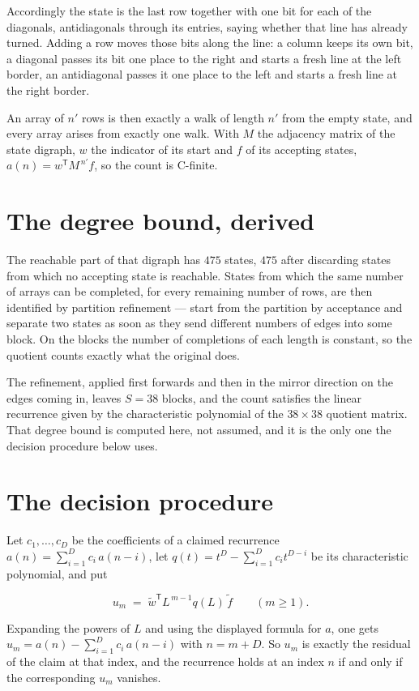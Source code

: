 \documentclass[11pt]{article}
\theoremstyle{definition}
\begin{document}
Accordingly the state is the last row together with one bit for each of the diagonals, antidiagonals through its entries, saying whether that line has already turned. Adding a row moves those bits along the line: a column keeps its own bit, a diagonal passes its bit one place to the right and starts a fresh line at the left border, an antidiagonal passes it one place to the left and starts a fresh line at the right border.

An array of $n'$ rows is then exactly a walk of length $n'$ from the empty state, and every array arises from exactly one walk. With $M$ the adjacency matrix of the state digraph, $w$ the indicator of its start and $f$ of its accepting states, $a(n) = w^{\mathsf T}M^{\,n'}f$, so the count is C-finite.

\section{The degree bound, derived}

The reachable part of that digraph has $475$ states, $475$ after discarding states from which no accepting state is reachable. States from which the same number of arrays can be completed, for every remaining number of rows, are then identified by partition refinement --- start from the partition by acceptance and separate two states as soon as they send different numbers of edges into some block. On the blocks the number of completions of each length is constant, so the quotient counts exactly what the original does.

The refinement, applied first forwards and then in the mirror direction on the edges coming in, leaves $S = 38$ blocks, and the count satisfies the linear recurrence given by the characteristic polynomial of the $38 \times 38$ quotient matrix. That degree bound is computed here, not assumed, and it is the only one the decision procedure below uses.

\section{The decision procedure}

Let $c_1,\dots,c_D$ be the coefficients of a claimed recurrence $a(n) = \sum_{i=1}^{D} c_i\,a(n-i)$, let $q(t) = t^{D} - \sum_{i=1}^{D} c_i t^{D-i}$ be its characteristic polynomial, and put

\[u_m \;=\; \tilde w^{\mathsf T} L^{\,m-1} q(L)\,\tilde f \qquad (m \ge 1).\]

Expanding the powers of $L$ and using the displayed formula for $a$, one gets $u_m = a(n) - \sum_{i=1}^{D} c_i\,a(n-i)$ with $n = m + D$. So $u_m$ is exactly the residual of the claim at that index, and the recurrence holds at an index $n$ if and only if the corresponding $u_m$ vanishes.
\end{document}
